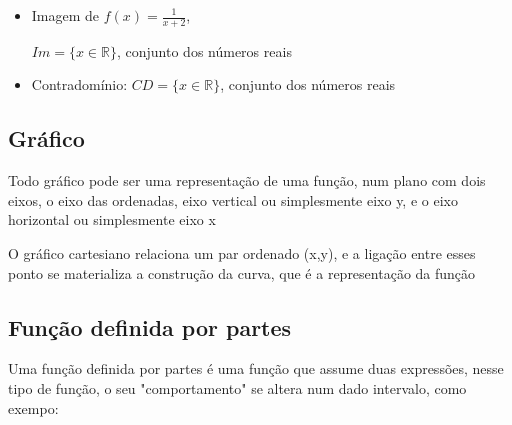 \begin{multicols*}{2}
\begin{itemize}[wide, labelwidth=!, labelindent=0pt]
        \item Imagem de $f(x) = \frac{1}{x+2}$,

              $Im = \{x \in \mathbb{R} \}$, conjunto dos números reais

        \item Contradomínio: $CD = \{x \in \mathbb{R} \}$, conjunto dos números reais
    \end{itemize}

    \subsection*{Gráfico}
    Todo gráfico pode ser uma representação de uma função, num plano com dois eixos, o eixo das 			ordenadas, eixo vertical ou simplesmente eixo y, e o eixo horizontal ou simplesmente eixo x

    O gráfico cartesiano relaciona um par ordenado (x,y), e a ligação entre esses ponto se 					materializa a construção da curva, que é a representação da função




    \subsection*{Função definida por partes}
    Uma função definida por partes é uma função que assume duas expressões, nesse tipo de função, o 		seu "comportamento" se altera num dado intervalo, como exempo:


\end{multicols*}
